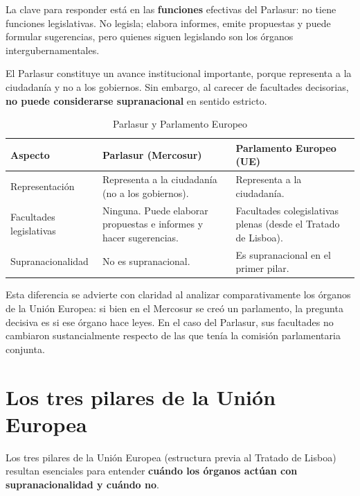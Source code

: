 \documentclass[12pt,oneside]{book}
\begin{document}
La clave para responder está en las \textbf{funciones} efectivas del Parlasur: no tiene funciones legislativas. No legisla; elabora informes, emite propuestas y puede formular sugerencias, pero quienes siguen legislando son los órganos intergubernamentales.

El Parlasur constituye un avance institucional importante, porque representa a la ciudadanía y no a los gobiernos. Sin embargo, al carecer de facultades decisorias, \textbf{no puede considerarse supranacional} en sentido estricto.

\begin{table}[H]
\centering
\caption{Parlasur y Parlamento Europeo}
\small
\begin{tabularx}{\textwidth}{@{}P{3.2cm}YY@{}}
\toprule
\textbf{Aspecto} & \textbf{Parlasur (Mercosur)} & \textbf{Parlamento Europeo (UE)} \\
\midrule
Representación & Representa a la ciudadanía (no a los gobiernos). & Representa a la ciudadanía. \\
Facultades legislativas & Ninguna. Puede elaborar propuestas e informes y hacer sugerencias. & Facultades colegislativas plenas (desde el Tratado de Lisboa). \\
Supranacionalidad & No es supranacional. & Es supranacional en el primer pilar. \\
\bottomrule
\end{tabularx}
\end{table}

Esta diferencia se advierte con claridad al analizar comparativamente los órganos de la Unión Europea: si bien en el Mercosur se creó un parlamento, la pregunta decisiva es si ese órgano hace leyes. En el caso del Parlasur, sus facultades no cambiaron sustancialmente respecto de las que tenía la comisión parlamentaria conjunta.

\section{Los tres pilares de la Unión Europea}


Los tres pilares de la Unión Europea (estructura previa al Tratado de Lisboa) resultan esenciales para entender \textbf{cuándo los órganos actúan con supranacionalidad y cuándo no}.
\end{document}
